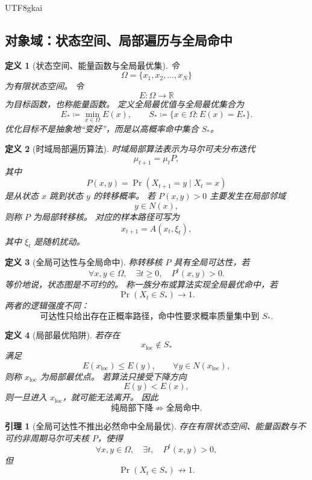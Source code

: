 \documentclass[12pt]{article}
\newtheorem{definition}{定义}[section]
\newtheorem{lemma}{引理}[section]
\newcommand{\RR}{\mathbb{R}}
\newcommand{\DefEq}{\coloneqq}
\begin{document}
\begin{CJK*}{UTF8}{gkai}
\subsection{对象域：状态空间、局部遍历与全局命中}
\label{subsec:tex55-bridge-objects}

\begin{definition}[状态空间、能量函数与全局最优集]
\label{def:tex55-state-energy}
令
\[
  \Omega=\{x_1,x_2,\ldots,x_N\}
\]
为有限状态空间。
令
\[
  E:\Omega\to\RR
\]
为目标函数，也称能量函数。
定义全局最优值与全局最优集合为
\[
  E_*\DefEq\min_{x\in\Omega}E(x),
  \qquad
  S_*\DefEq\{x\in\Omega:E(x)=E_*\}.
\]
优化目标不是抽象地“变好”，而是以高概率命中集合 \(S_*\)。
\end{definition}

\begin{definition}[时域局部遍历算法]
\label{def:tex55-local-markov}
时域局部算法表示为马尔可夫分布迭代
\[
  \mu_{t+1}=\mu_tP,
\]
其中
\[
  P(x,y)=\Pr(X_{t+1}=y\mid X_t=x)
\]
是从状态 \(x\) 跳到状态 \(y\) 的转移概率。
若 \(P(x,y)>0\) 主要发生在局部邻域
\[
  y\in N(x),
\]
则称 \(P\) 为局部转移核。
对应的样本路径可写为
\[
  x_{t+1}=A(x_t,\xi_t),
\]
其中 \(\xi_t\) 是随机扰动。
\end{definition}

\begin{definition}[全局可达性与全局命中]
\label{def:tex55-reachability-hit}
称转移核 \(P\) 具有全局可达性，若
\[
  \forall x,y\in\Omega,\quad \exists t\ge0,\quad P^t(x,y)>0.
\]
等价地说，状态图是不可约的。
称一族分布或算法实现全局最优命中，若
\[
  \Pr(X_t\in S_*)\to1.
\]
两者的逻辑强度不同：
\[
  \text{可达性只给出存在正概率路径，命中性要求概率质量集中到 }S_*.
\]
\end{definition}

\begin{definition}[局部最优陷阱]
\label{def:tex55-local-trap}
若存在
\[
  x_{\mathrm{loc}}\notin S_*
\]
满足
\[
  E(x_{\mathrm{loc}})\le E(y),
  \qquad
  \forall y\in N(x_{\mathrm{loc}}),
\]
则称 \(x_{\mathrm{loc}}\) 为局部最优点。
若算法只接受下降方向
\[
  E(y)<E(x),
\]
则一旦进入 \(x_{\mathrm{loc}}\)，就可能无法离开。
因此
\[
  \text{纯局部下降}
  \not\Rightarrow
  \text{全局命中}.
\]
\end{definition}

\begin{lemma}[全局可达性不推出必然命中全局最优]
\label{lem:tex55-reachable-not-hit}
存在有限状态空间、能量函数与不可约非周期马尔可夫核 \(P\)，使得
\[
  \forall x,y\in\Omega,\quad \exists t,\quad P^t(x,y)>0,
\]
但
\[
  \Pr(X_t\in S_*)\not\to1.
\]
\end{lemma}


\end{CJK*}
\end{document}
